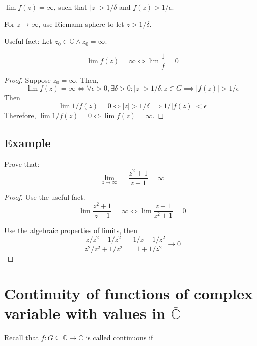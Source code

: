 \documentclass{article}
\newtheorem{one minute paper}[theorem]{One Minute Paper}
\begin{document}
$\lim f(z) = \infty$, such that $|z| > 1/\delta$ and $f(z) > 1/\epsilon$. 

For $z \rightarrow \infty$, use Riemann sphere to let $ z> 1/\delta$. 

Useful fact: Let $z_0 \in \mathbb{C} \land z_0 = \infty$.

\begin{equation}
    \lim f(z) = \infty \iff \lim \frac{1}{f} = 0
\end{equation}

\begin{proof}
    Suppose $z_0 = \infty$. Then, 
    \begin{equation}
        \lim f(z) = \infty \iff \forall \epsilon >0, \exists \delta >0: |z| > 1/\delta, z \in G \implies |f(z)| > 1/\epsilon
    \end{equation}
    Then 
    \begin{equation}
        \lim 1/f(z) = 0 \iff |z| > 1/\delta  \implies 1/|f(z)| < \epsilon 
    \end{equation}
    Therefore, $\lim 1/f(z) = 0 \iff \lim f(z) = \infty$. 
\end{proof}

\subsection*{Example}

Prove that:
\begin{equation}
    \lim_{z \rightarrow \infty} =\frac{z^2 + 1}{z-1} = \infty
\end{equation}

\begin{proof}
    Use the useful fact. $$\lim \frac{z^2 + 1}{z-1} = \infty \iff \lim \frac{z-1}{z^2 + 1} = 0$$

    Use the algebraic properties of limits, then 
    \begin{equation}
        \frac{z/z^2 - 1/z^2}{z^2/z^2 + 1/z^2} = \frac{1/z - 1/z^2}{1 + 1/z^2} \rightarrow 0
    \end{equation} 

\end{proof}

\section*{Continuity of functions of complex variable with values in $\overline{\mathbb{C}}$}
Recall that $f: G \subseteq \overline{\mathbb{C}} \rightarrow \overline{\mathbb{C}}$ is called continuous if 
\end{document}
